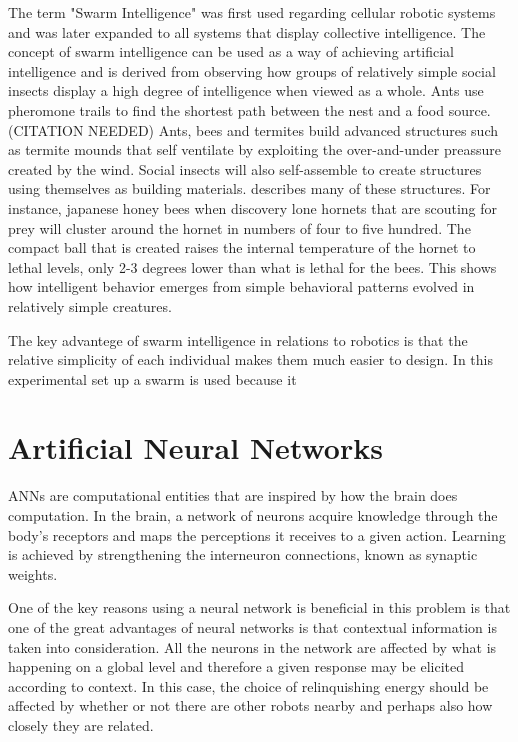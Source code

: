 \documentclass[a4paper]{book}
\begin{document}
The term "Swarm Intelligence" was first used \cite{beni_swarm_1993} regarding cellular robotic systems and was later expanded to all systems that display collective intelligence.
The concept of swarm intelligence can be used as a way of achieving artificial intelligence and is derived from observing how groups of relatively simple social insects display a high degree of intelligence when viewed as a whole. %
Ants use pheromone trails to find the shortest path between the nest and a food source. (CITATION NEEDED) 
Ants, bees and termites build advanced structures such as termite mounds that self ventilate by exploiting the over-and-under preassure created by the wind. 
Social insects will also self-assemble to create structures using themselves as building materials. 
\cite{anderson_self-assemblages_2002} describes many of these structures. 
For instance, japanese honey bees when discovery lone hornets that are scouting for prey will cluster around the hornet in numbers of four to five hundred.
The compact ball that is created raises the internal temperature of the hornet to lethal levels, only 2-3 degrees lower than what is lethal for the bees.
This shows how intelligent behavior emerges from simple behavioral patterns evolved in relatively simple creatures. %

The key advantege of swarm intelligence in relations to robotics is that the relative simplicity of each individual makes them much easier to design. In this experimental set up a swarm is used because it 


\section{Artificial Neural Networks}

ANNs are computational entities that are inspired by how the brain does computation. 
In the brain, a network of neurons acquire knowledge through the body's receptors and maps the perceptions it receives to a given action. 
Learning is achieved by strengthening the interneuron connections, known as synaptic weights. \cite{haykin_neural_1994} 

One of the key reasons using a neural network is beneficial in this problem is that one of the great advantages of neural networks is that contextual information is taken into consideration. 
All the neurons in the network are affected by what is happening on a global level and therefore a given response may be elicited according to context.
In this case, the choice of relinquishing energy should be affected by whether or not there are other robots nearby and perhaps also how closely they are related.
\end{document}
